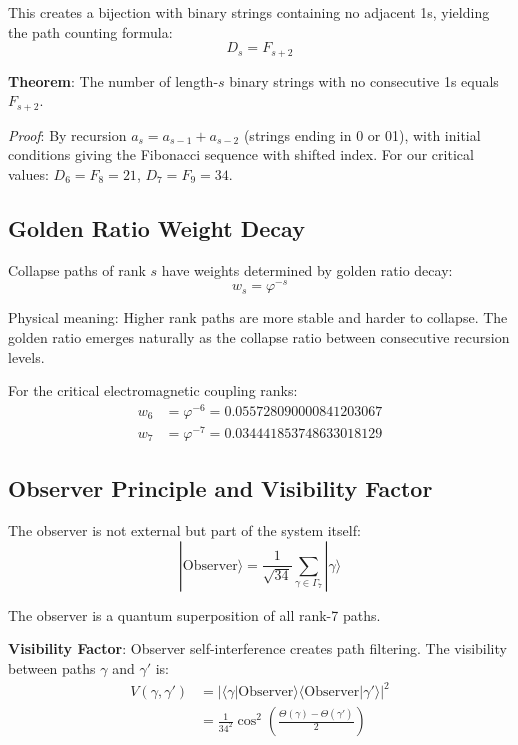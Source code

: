 \documentclass[%
 reprint,
 amsmath,amssymb,
 aps,
 prd,
 10pt,
 nofootinbib,      %
 longbibliography  %
]{revtex4-2}
\theoremstyle{definition}
\theoremstyle{remark}
\begin{document}
This creates a bijection with binary strings containing no adjacent 1s, yielding the path counting formula:
\begin{equation}
  D_s = F_{s+2}
  \label{eq:Fibonacci-deg}
\end{equation}

\textbf{Theorem}: The number of length-$s$ binary strings with no consecutive 1s equals $F_{s+2}$.

\textit{Proof}: By recursion $a_s = a_{s-1} + a_{s-2}$ (strings ending in 0 or 01), with initial conditions giving the Fibonacci sequence with shifted index. For our critical values: $D_6 = F_8 = 21$, $D_7 = F_9 = 34$.

\subsection{Golden Ratio Weight Decay}

Collapse paths of rank $s$ have weights determined by golden ratio decay:
\begin{equation}
w_s = \varphi^{-s}
\end{equation}

Physical meaning: Higher rank paths are more stable and harder to collapse. The golden ratio emerges naturally as the collapse ratio between consecutive recursion levels.

For the critical electromagnetic coupling ranks:
\begin{align}
w_6 &= \varphi^{-6} = 0.055728090000841203067 \\
w_7 &= \varphi^{-7} = 0.034441853748633018129
\end{align}

\subsection{Observer Principle and Visibility Factor}

The observer is not external but part of the system itself:
\begin{equation}
|\text{Observer}\rangle = \frac{1}{\sqrt{34}} \sum_{\gamma \in \Gamma_7} |\gamma\rangle
\end{equation}

The observer is a quantum superposition of all rank-7 paths.

\textbf{Visibility Factor}: Observer self-interference creates path filtering. The visibility between paths $\gamma$ and $\gamma'$ is:
\begin{align}
V(\gamma, \gamma') &= \left|\langle\gamma|\text{Observer}\rangle\langle\text{Observer}|\gamma'\rangle\right|^2 \\
&= \frac{1}{34^2} \cos^2\left(\frac{\Theta(\gamma) - \Theta(\gamma')}{2}\right)
\end{align}
\end{document}

